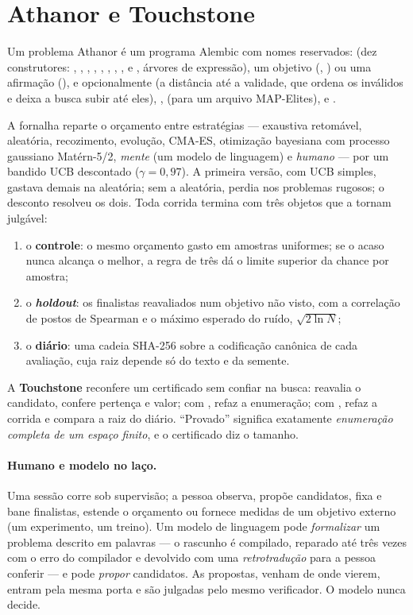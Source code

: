 \section{Athanor e Touchstone}\label{sec:banc-athanor}

Um problema Athanor é um programa Alembic com nomes reservados:  (dez construtores: , , , , , , , ,  e , árvores de expressão), um objetivo (, ) ou uma afirmação (), e opcionalmente  (a distância até a validade, que ordena os inválidos e deixa a busca subir até eles), ,  (para um arquivo MAP-Elites),  e .

A fornalha reparte o orçamento entre estratégias --- exaustiva retomável, aleatória, recozimento, evolução, CMA-ES, otimização bayesiana com processo gaussiano Matérn-5/2, \emph{mente} (um modelo de linguagem) e \emph{humano} --- por um bandido UCB descontado ($\gamma = 0{,}97$). A primeira versão, com UCB simples, gastava demais na aleatória; sem a aleatória, perdia nos problemas rugosos; o desconto resolveu os dois. Toda corrida termina com três objetos que a tornam julgável:
\begin{enumerate}
  \item o \textbf{controle}: o mesmo orçamento gasto em amostras uniformes; se o acaso nunca alcança o melhor, a regra de três dá o limite superior da chance por amostra;
  \item o \textbf{\textit{holdout}}: os finalistas reavaliados num objetivo não visto, com a correlação de postos de Spearman e o máximo esperado do ruído, $\sqrt{2 \ln N}$;
  \item o \textbf{diário}: uma cadeia SHA-256 sobre a codificação canônica de cada avaliação, cuja raiz depende só do texto e da semente.
\end{enumerate}

A \textbf{Touchstone} reconfere um certificado sem confiar na busca: reavalia o candidato, confere pertença e valor; com , refaz a enumeração; com , refaz a corrida e compara a raiz do diário. ``Provado'' significa exatamente \emph{enumeração completa de um espaço finito}, e o certificado diz o tamanho.

\paragraph{Humano e modelo no laço.} Uma sessão corre sob supervisão; a pessoa observa, propõe candidatos, fixa e bane finalistas, estende o orçamento ou fornece medidas de um objetivo externo (um experimento, um treino). Um modelo de linguagem pode \emph{formalizar} um problema descrito em palavras --- o rascunho é compilado, reparado até três vezes com o erro do compilador e devolvido com uma \emph{retrotradução} para a pessoa conferir --- e pode \emph{propor} candidatos. As propostas, venham de onde vierem, entram pela mesma porta e são julgadas pelo mesmo verificador. O modelo nunca decide.

